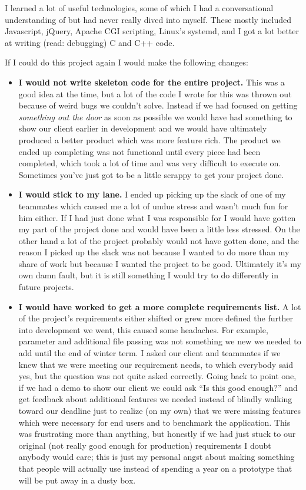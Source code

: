 I learned a lot of useful technologies, some of which I had a conversational understanding of but had never really dived into myself.
These mostly included Javascript, jQuery, Apache CGI scripting, Linux's systemd, and I got a lot better at writing (read: debugging) C and C++ code.

If I could do this project again I would make the following changes:

\begin{itemize}
  \item \textbf{I would not write skeleton code for the entire project.}
        This was a good idea at the time, but a lot of the code I wrote for this was thrown out because of weird bugs we couldn't solve.
        Instead if we had focused on getting \textit{something out the door} as soon as possible we would have had something to show our client earlier in development and we would have ultimately produced a better product which was more feature rich.
        The product we ended up completing was not functional until every piece had been completed, which took a lot of time and was very difficult to execute on.
        Sometimes you've just got to be a little scrappy to get your project done.
  \item \textbf{I would stick to my lane.}
        I ended up picking up the slack of one of my teammates which caused me a lot of undue stress and wasn't much fun for him either.
        If I had just done what I was responsible for I would have gotten my part of the project done and would have been a little less stressed.
        On the other hand a lot of the project probably would not have gotten done, and the reason I picked up the slack was not because I wanted to do more than my share of work but because I wanted the project to be good.
        Ultimately it's my own damn fault, but it is still something I would try to do differently in future projects.
  \item \textbf{I would have worked to get a more complete requirements list.}
        A lot of the project's requirements either shifted or grew more defined the further into development we went, this caused some headaches.
        For example, parameter and additional file passing was not something we new we needed to add until the end of winter term.
        I asked our client and teammates if we knew that we were meeting our requirement needs, to which everybody said yes, but the question was not quite asked correctly.
        Going back to point one, if we had a demo to show our client we could ask ``Is this good enough?'' and get feedback about additional features we needed instead of blindly walking toward our deadline just to realize (on my own) that we were missing features which were necessary for end users and to benchmark the application.
        This was frustrating more than anything, but honestly if we had just stuck to our original (not really good enough for production) requirements I doubt anybody would care; this is just my personal angst about making something that people will actually use instead of spending a year on a prototype that will be put away in a dusty box.
\end{itemize}
